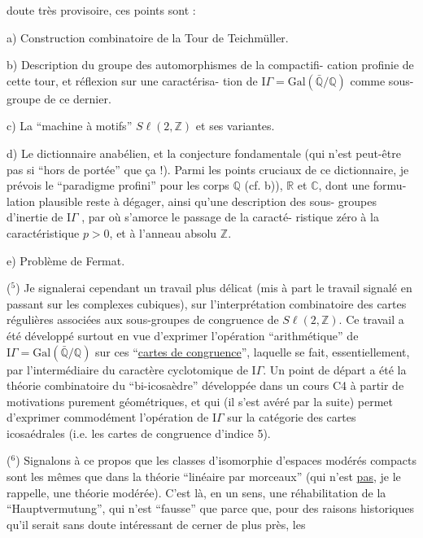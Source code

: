 
doute très provisoire, ces points sont :

a) Construction combinatoire de la Tour de Teichmüller.

b) Description du groupe des automorphismes de la compactifi-%
cation profinie de cette tour, et réflexion sur une caractérisa-%
tion de $\mathrm{I}\!\Gamma = \mathrm{Gal}(\bar{\mathbb{Q}}/\mathbb{Q})$ comme sous-groupe de ce dernier.

c) La ``machine à motifs'' $S\ell(2,\mathbb{Z})$ et ses variantes.

d) Le dictionnaire anabélien, et la conjecture fondamentale
(qui n'est peut-être pas si ``hors de portée'' que ça !). Parmi
les points cruciaux de ce dictionnaire, je prévois le ``paradigme
profini'' pour les corps $\mathbb{Q}$ (cf. b)), $\mathbb{R}$ et $\mathbb{C}$, dont une formu-%
lation plausible reste à dégager, ainsi qu'une description des sous-%
groupes d'inertie de $\mathrm{I}\!\Gamma$ , par où s'amorce le passage de la caracté-%
ristique zéro à la caractéristique $p > 0$, et à l'anneau absolu $\mathbb{Z}$.

e) Problème de Fermat.

($^5$) Je signalerai cependant un travail plus délicat (mis à part
le travail signalé en passant sur les complexes cubiques), sur
l'interprétation combinatoire des cartes régulières associées aux
\margin{\unsure{\textbackslash}}sous-groupes de congruence de $S\ell(2,\mathbb{Z})$. Ce travail a été développé
surtout en vue d'exprimer l'opération ``arithmétique'' de $\mathrm{I}\!\Gamma = \mathrm{Gal}(\bar{\mathbb{Q}}/\mathbb{Q})$
sur ces ``\uline{cartes de congruence}'', laquelle se fait, essentiellement,
par l'intermédiaire du caractère cyclotomique de $\mathrm{I}\!\Gamma$. Un point de
départ a été la théorie combinatoire du ``bi-icosaèdre'' développée
dans un cours C4 à partir de motivations purement géométriques,
et qui (il s'est avéré par la suite) permet d'exprimer commodément
l'opération de $\mathrm{I}\!\Gamma$ sur la catégorie des cartes icosaédrales (i.e.
les cartes de congruence d'indice 5).

($^6$) Signalons à ce propos que les classes d'isomorphie d'espaces
modérés compacts sont les mêmes que dans la théorie ``linéaire par
morceaux'' (qui n'est \uline{pas}, je le rappelle, une théorie modérée).
C'est là, en un sens, une réhabilitation de la ``Hauptvermutung'',
qui n'est ``fausse'' que parce que, pour des raisons historiques
qu'il serait sans doute intéressant de cerner de plus près, les

